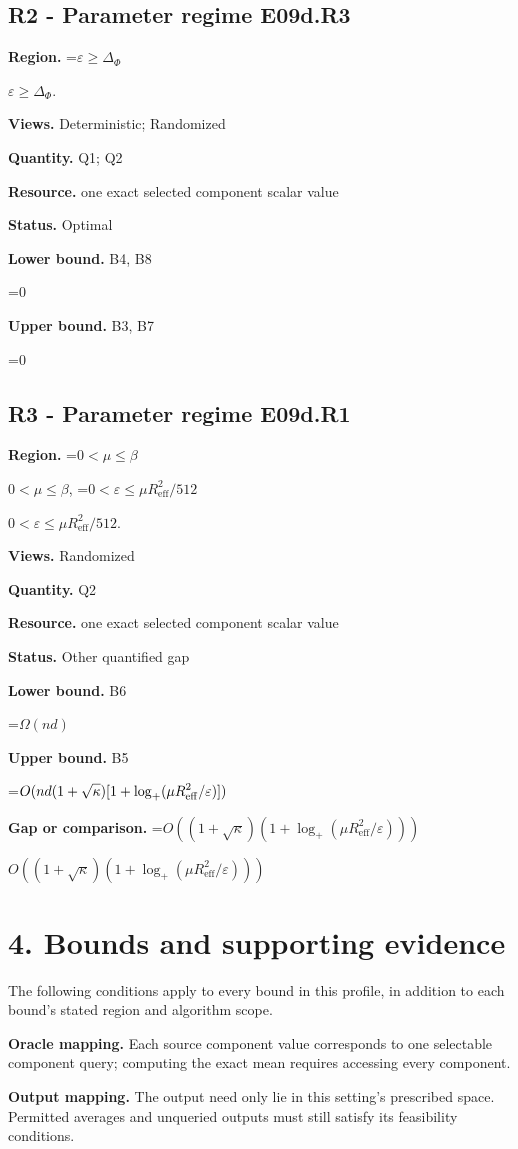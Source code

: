 \documentclass[10pt,a4paper]{article}
\newcommand{\AtlasMath}[1]{\par\begingroup\centering\setbox0=\hbox{$\displaystyle #1$}\ifdim\wd0>1.4\linewidth\typeout{ATLAS WIDE FORMULA: \the\wd0}\fi\ifdim\wd0>\linewidth\resizebox{\linewidth}{!}{\box0}\else\box0\fi\par\endgroup}
\newcommand{\AtlasInlineMath}[1]{\begingroup\setbox0=\hbox{$#1$}\ifdim\wd0>.4\linewidth\endgroup\AtlasMath{#1}\else\endgroup$#1$\fi}
\begin{document}
\subsection{R2 - Parameter regime E09d.R3}
\textbf{Region.} \AtlasInlineMath{\varepsilon\ge\Delta_\Phi}.

\textbf{Views.} Deterministic; Randomized

\textbf{Quantity.} Q1; Q2

\textbf{Resource.} one exact selected component scalar value

\textbf{Status.} Optimal

\textbf{Lower bound.} B4, B8

\AtlasMath{0}
\textbf{Upper bound.} B3, B7

\AtlasMath{0}
\subsection{R3 - Parameter regime E09d.R1}
\textbf{Region.} \AtlasInlineMath{0<\mu\le\beta}, \AtlasInlineMath{0<\varepsilon\le\mu R_{\mathrm{eff}}^2/512}.

\textbf{Views.} Randomized

\textbf{Quantity.} Q2

\textbf{Resource.} one exact selected component scalar value

\textbf{Status.} Other quantified gap

\textbf{Lower bound.} B6

\AtlasMath{\Omega(nd)}
\textbf{Upper bound.} B5

\AtlasMath{O(nd(1+\sqrt\kappa)[1+\log_+(\mu R_{\rm eff}^2/\varepsilon)])}
\textbf{Gap or comparison.} \AtlasInlineMath{O((1+\sqrt{\kappa})(1+\log_+(\mu R_{\mathrm{eff}}^2/\varepsilon)))}

\section{4. Bounds and supporting evidence}
The following conditions apply to every bound in this profile, in addition to each bound's stated region and algorithm scope.

\textbf{Oracle mapping.} Each source component value corresponds to one selectable component query; computing the exact mean requires accessing every component.

\textbf{Output mapping.} The output need only lie in this setting's prescribed space. Permitted averages and unqueried outputs must still satisfy its feasibility conditions.
\end{document}
